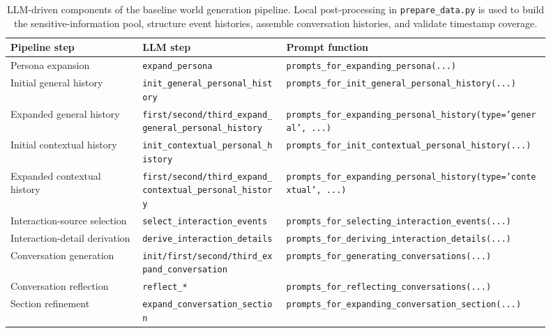 \begin{table}[t]
\centering
\small
\begin{tabular}{p{0.22\linewidth}p{0.24\linewidth}p{0.44\linewidth}}
\hline
\textbf{Pipeline step} & \textbf{LLM step} & \textbf{Prompt function} \\
\hline
Persona expansion & \texttt{expand\_persona} & \texttt{prompts\_for\_expanding\_persona(...)} \\
Initial general history & \texttt{init\_general\_personal\_history} & \texttt{prompts\_for\_init\_general\_personal\_history(...)} \\
Expanded general history & \texttt{first/second/third\_expand\_general\_personal\_history} & \texttt{prompts\_for\_expanding\_personal\_history(type='general', ...)} \\
Initial contextual history & \texttt{init\_contextual\_personal\_history} & \texttt{prompts\_for\_init\_contextual\_personal\_history(...)} \\
Expanded contextual history & \texttt{first/second/third\_expand\_contextual\_personal\_history} & \texttt{prompts\_for\_expanding\_personal\_history(type='contextual', ...)} \\
Interaction-source selection & \texttt{select\_interaction\_events} & \texttt{prompts\_for\_selecting\_interaction\_events(...)} \\
Interaction-detail derivation & \texttt{derive\_interaction\_details} & \texttt{prompts\_for\_deriving\_interaction\_details(...)} \\
Conversation generation & \texttt{init/first/second/third\_expand\_conversation} & \texttt{prompts\_for\_generating\_conversations(...)} \\
Conversation reflection & \texttt{reflect\_*} & \texttt{prompts\_for\_reflecting\_conversations(...)} \\
Section refinement & \texttt{expand\_conversation\_section} & \texttt{prompts\_for\_expanding\_conversation\_section(...)} \\
\hline
\end{tabular}
\caption{LLM-driven components of the baseline world generation pipeline. Local post-processing in \texttt{prepare\_data.py} is used to build the sensitive-information pool, structure event histories, assemble conversation histories, and validate timestamp coverage.}
\label{tab:baseline-pipeline-prompts}
\end{table}
